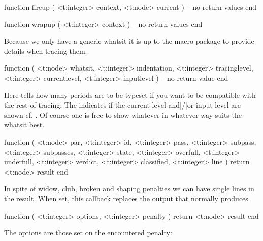 \starttyping[option=LUA]
function fireup (
    <t:integer> context,
    <t:node> current
)
    -- no return values
end
\stoptyping

\starttyping[option=LUA]
function wrapup (
    <t:integer> context
)
    -- no return values
end
\stoptyping

\stopsubsection

\startsubsection[title=show_whatsit]

Because we only have a generic whatsit it is up to the macro package to provide
details when tracing them.

\starttyping[option=LUA]
function (
    <t:node>    whatsit,
    <t:integer> indentation,
    <t:integer> tracinglevel,
    <t:integer> currentlevel,
    <t:integer> inputlevel
)
    -- no return value
end
\stoptyping

Here  tells how many periods are to be typeset if you want to
be compatible with the rest of tracing. The  indicates if the
current level and|/|or input level are shown cf. \type {\tracinglevels}. Of
course one is free to show whatever in whatever way suits the whatsit best.

\stopsubsection

\startsubsection[title=linebreak_quality]

\starttyping[option=LUA]
function (
    <t:node>    par,
    <t:integer> id,
    <t:integer> pass,
    <t:integer> subpass,
    <t:integer> subpasses,
    <t:integer> state,
    <t:integer> overfull,
    <t:integer> underfull,
    <t:integer> verdict,
    <t:integer> classified,
    <t:integer> line
)
    return <t:node> result
end
\stoptyping

\stopsubsection

\startsubsection[title=show_loners]

In spite of widow, club, broken and shaping penalties we can have single lines in the
result. When set, this callback replaces the output that normally \typ {\tracingloners}
produces.

\starttyping[option=LUA]
function (
    <t:integer> options,
    <t:integer> penalty
)
    return <t:node> result
end
\stoptyping

The options are those set on the encountered penalty:

\startthreerows
{}
\stopthreerows

\stopsubsection

\startsubsection[title=get_attribute]

